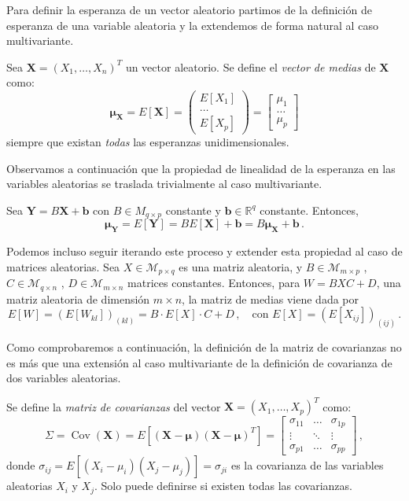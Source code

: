 Para definir la esperanza de un vector aleatorio partimos de la definición de esperanza de una variable aleatoria y la extendemos de forma natural al caso multivariante.

\begin{ndef}
  Sea $\boldsymbol X=(X_1,\dots,X_n)^T$ un vector aleatorio. Se define el \emph{vector de medias} de $\boldsymbol X$ como:
  \[
  \boldsymbol \mu_{\boldsymbol X} = E[\boldsymbol X] = \begin{pmatrix}  E[X_1] \\ \dots \\ E[X_p] \end{pmatrix} = \begin{bmatrix} \mu_1 \\ \dots \\ \mu_p \end{bmatrix}
  \]
  siempre que existan \emph{todas} las esperanzas unidimensionales.
  \end{ndef}

  Observamos a continuación que la propiedad de linealidad de la esperanza en las variables aleatorias se traslada trivialmente al caso multivariante.

\begin{nprop}
  Sea $\boldsymbol Y = B\boldsymbol X + \boldsymbol b$ con $B \in M_{q\times p}$ constante y $\boldsymbol b \in \mathbb R^q$ constante. Entonces,
  \[
    \boldsymbol \mu_{\boldsymbol Y} = E[\boldsymbol Y] = BE[\boldsymbol X] + \boldsymbol b = B\boldsymbol \mu_{\boldsymbol X} + \boldsymbol b\,.
\]
\end{nprop}

Podemos incluso seguir iterando este proceso y extender esta propiedad al caso de matrices aleatorias. Sea $X\in \mathcal M_{p\times q}$ es una matriz aleatoria, y $B\in \mathcal M_{m\times p}$ , $C \in \mathcal M_{q\times n}$ , $D \in \mathcal M_{m \times n}$ matrices constantes. Entonces, para $W = BXC + D$, una matriz aleatoria de dimensión $m\times n$, la matriz de medias viene dada por
\[
E[W] = \left(E[W_{kl}]\right)_{(kl)} = B \cdot E[X] \cdot C + D\,, \quad \text{con } E[X] = \left(E[X_{ij}]\right)_{(ij)}\,.
\]

Como comprobaremos a continuación, la definición de la matriz de covarianzas no es más que una extensión al caso multivariante de la definición de covarianza de dos variables aleatorias.

\begin{ndef}
  Se define la \emph{matriz de covarianzas} del vector $\boldsymbol X = (X_1,\dots,X_p)^T$ como:
  \[
\Sigma = \operatorname{Cov}(\boldsymbol X) = E\left[(\boldsymbol X-\boldsymbol \mu)(\boldsymbol X-\boldsymbol \mu)^T\right] = \begin{bmatrix} \sigma_{11} & \dots & \sigma_{1p} \\ \vdots& \ddots & \vdots \\ \sigma_{p1} &  \dots & \sigma_{pp}\end{bmatrix}\,,
\]
donde $\sigma_{ij} = E\left[(X_i - \mu_i)(X_j - \mu_j)\right] = \sigma_{ji}$ es la covarianza de las variables aleatorias $X_i$ y $X_j$. Solo puede definirse si existen todas las covarianzas. 
\end{ndef}

